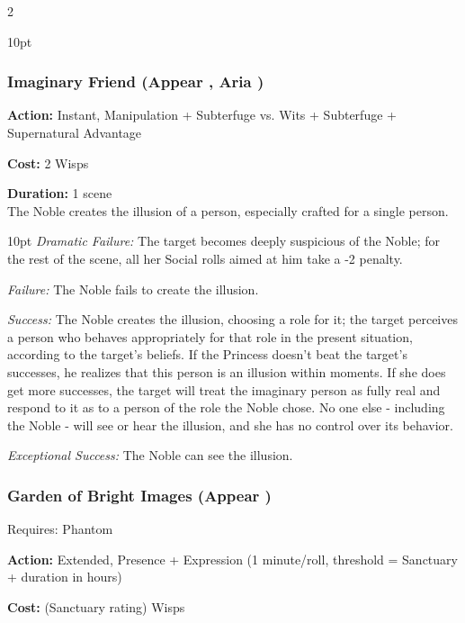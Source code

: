 \begin{multicols}{2}
\begin{myindentpar}{10pt}
\end{myindentpar}

\subsubsection*{Imaginary Friend (Appear \textbullet\textbullet\textbullet\textbullet, Aria \textbullet\textbullet\textbullet)}

\noindent \textbf{Action:} Instant, Manipulation + Subterfuge vs. Wits + Subterfuge + Supernatural Advantage

\noindent \textbf{Cost:} 2 Wisps

\noindent \textbf{Duration:} 1 scene\\

\noindent The Noble creates the illusion of a person, especially crafted for a single person.

\begin{myindentpar}{10pt}    \emph{Dramatic Failure:} The target becomes deeply suspicious of the Noble; for the rest of the scene, all her Social rolls aimed at him take a -2 penalty.

    \emph{Failure:}  The Noble fails to create the illusion.

    \emph{Success:} The Noble creates the illusion, choosing a role for it; the target perceives a person who behaves appropriately for that role in the present situation, according to the target’s beliefs. If the Princess doesn’t beat the target’s successes, he realizes that this person is an illusion within moments. If she does get more successes, the target will treat the imaginary person as fully real and respond to it as to a person of the role the Noble chose. No one else - including the Noble - will see or hear the illusion, and she has no control over its behavior.

    \emph{Exceptional Success:} The Noble can see the illusion. 	\end{myindentpar}

\subsubsection*{Garden of Bright Images (Appear \textbullet\textbullet\textbullet\textbullet)}
\noindent Requires: Phantom

\noindent \textbf{Action:} Extended, Presence + Expression (1 minute/roll, threshold = Sanctuary + duration in hours)

\noindent \textbf{Cost:} (Sanctuary rating) Wisps


\end{multicols}
